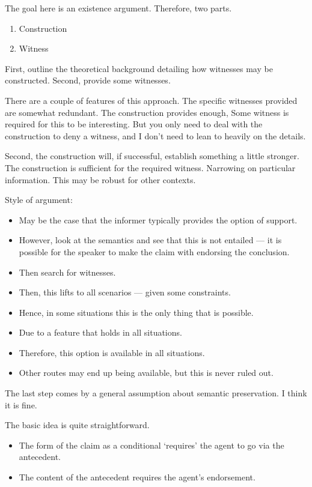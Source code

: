 \documentclass[10pt]{article}
\begin{document}
\begin{note}
  The goal here is an existence argument.
  Therefore, two parts.
  \begin{enumerate}
  \item Construction
  \item Witness
  \end{enumerate}
  First, outline the theoretical background detailing how witnesses may be constructed.
  Second, provide some witnesses.

  There are a couple of features of this approach.
  The specific witnesses provided are somewhat redundant.
  The construction provides enough,
  Some witness is required for this to be interesting.
  But you only need to deal with the construction to deny a witness, and I don't need to lean to heavily on the details.

  Second, the construction will, if successful, establish something a little stronger.
  The construction is sufficient for the required witness.
  Narrowing on particular information.
  This may be robust for other contexts.

  Style of argument:
  \begin{itemize}
  \item May be the case that the informer typically provides the option of support.
  \item However, look at the semantics and see that this is not entailed --- it is possible for the speaker to make the claim with endorsing the conclusion.
  \item Then search for witnesses.
  \item Then, this lifts to all scenarios --- given some constraints.
  \item Hence, in some situations this is the only thing that is possible.
  \item Due to a feature that holds in all situations.
  \item Therefore, this option is available in all situations.
  \item Other routes may end up being available, but this is never ruled out.
  \end{itemize}
  The last step comes by a general assumption about semantic preservation.
  I think it is fine.
\end{note}

\begin{note}
  The basic idea is quite straightforward.
  \begin{itemize}
  \item The form of the claim as a conditional `requires' the agent to go via the antecedent.
  \item The content of the antecedent requires the agent's endorsement.
  \end{itemize}
\end{note}
\end{document}
